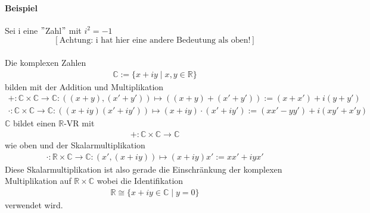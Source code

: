 \documentclass[12pt,a4paper,parskip=half-,DIV=15]{scrartcl}
\begin{document}
\paragraph{Beispiel} Sei i eine $"$Zahl$"$ mit $i^2=-1$\\
 \[[\text{Achtung: i hat hier eine andere Bedeutung als oben!}]\]\\
 Die komplexen Zahlen
 \begin{align*}
 \mathbb{C}:=\{{x+iy\mid x,y\in \mathbb{R}}\}
 \end{align*}
bilden mit der Addition und Multiplikation
\begin{align*}
+:\mathbb{C}\times \mathbb{C} \to \mathbb{C}: ((x+y),(x'+y')) \mapsto ((x+y)+(x'+y')) := (x+x')+i(y+y')\\
\cdot :\mathbb{C}\times \mathbb{C} \to \mathbb{C}: ((x+iy)(x'+iy'))\mapsto (x+iy)\cdot (x'+iy') :=(xx'-yy')+i(xy'+x'y)
\end{align*}
$\mathbb{C}$ bildet einen $\mathbb{R}$-VR mit
\begin{align*}
+:\mathbb{C}\times\mathbb{C}\to\mathbb{C}
\end{align*}
wie oben und der Skalarmultiplikation
\begin{align*}
\cdot:\mathbb{R}\times\mathbb{C}\to\mathbb{C}:(x',(x+iy))\mapsto(x+iy)x':=xx'+iyx'
\end{align*}
Diese Skalarmultiplikation ist also gerade die Einschränkung der komplexen Multiplikation auf $\mathbb{R}\times\mathbb{C}$ wobei die Identifikation
\begin{align*}
\mathbb{R}\cong \{{x+iy\in\mathbb{C}\mid y=0}\}
\end{align*}
verwendet wird.
\end{document}
